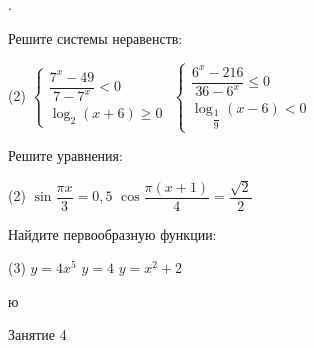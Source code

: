 \begin{class}[number=2]
	\begin{listofex}
		\item .
	\end{listofex}
\end{class}

\begin{homework}[number=1]
	\begin{listofex}
		\item Решите системы неравенств:
		\begin{tasks}(2)
			\task \( \begin{cases} \dfrac{7^x-49}{7-7^x}<0 \\ \log_2(x+6)\ge0 \end{cases} \)
			\task \( \begin{cases} \dfrac{6^x-216}{36-6^x}\le0 \\ \log_{\dfrac{1}{9}}(x-6)<0 \end{cases} \)
		\end{tasks}
		\item Решите уравнения: 
		\begin{tasks}(2)
			\task \( \sin\dfrac{\pi x}{3}=0,5 \)
			\task \( \cos\dfrac{\pi(x+1)}{4}=\dfrac{\sqrt{2}}{2} \)
		\end{tasks}
		\item Найдите первообразную функции:
		\begin{tasks}(3)
			\task \( y=4x^5 \)
			\task \( y=4 \)
			\task \( y=x^2+2 \)
		\end{tasks}
	\end{listofex}
\end{homework}

\begin{class}[number=3]
	\begin{listofex}
		\item ю
	\end{listofex}
\end{class}

\begin{class}[number=4]
	\begin{listofex}
		\item Занятие 4
	\end{listofex}
\end{class}

